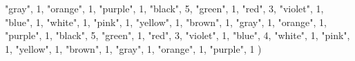 \documentclass[
]{article}
\newenvironment{Shaded}{\begin{snugshade}}{\end{snugshade}}
\newcommand{\DecValTok}[1]{\textcolor[rgb]{0.00,0.00,0.81}{#1}}
\newcommand{\NormalTok}[1]{#1}
\newcommand{\StringTok}[1]{\textcolor[rgb]{0.31,0.60,0.02}{#1}}
\begin{document}
\begin{Shaded}
\begin{Highlighting}[]
  \StringTok{"gray"}\NormalTok{, }\DecValTok{1}\NormalTok{,}
  \StringTok{"orange"}\NormalTok{, }\DecValTok{1}\NormalTok{,}
  \StringTok{"purple"}\NormalTok{, }\DecValTok{1}\NormalTok{,}
    \StringTok{"black"}\NormalTok{, }\DecValTok{5}\NormalTok{,}
  \StringTok{"green"}\NormalTok{, }\DecValTok{1}\NormalTok{,}
  \StringTok{"red"}\NormalTok{, }\DecValTok{3}\NormalTok{,}
  \StringTok{"violet"}\NormalTok{, }\DecValTok{1}\NormalTok{,}
  \StringTok{"blue"}\NormalTok{, }\DecValTok{1}\NormalTok{,}
  \StringTok{"white"}\NormalTok{, }\DecValTok{1}\NormalTok{,}
  \StringTok{"pink"}\NormalTok{, }\DecValTok{1}\NormalTok{,}
  \StringTok{"yellow"}\NormalTok{, }\DecValTok{1}\NormalTok{,}
  \StringTok{"brown"}\NormalTok{, }\DecValTok{1}\NormalTok{,}
  \StringTok{"gray"}\NormalTok{, }\DecValTok{1}\NormalTok{,}
  \StringTok{"orange"}\NormalTok{, }\DecValTok{1}\NormalTok{,}
  \StringTok{"purple"}\NormalTok{, }\DecValTok{1}\NormalTok{,}
    \StringTok{"black"}\NormalTok{, }\DecValTok{5}\NormalTok{,}
  \StringTok{"green"}\NormalTok{, }\DecValTok{1}\NormalTok{,}
  \StringTok{"red"}\NormalTok{, }\DecValTok{3}\NormalTok{,}
  \StringTok{"violet"}\NormalTok{, }\DecValTok{1}\NormalTok{,}
  \StringTok{"blue"}\NormalTok{, }\DecValTok{4}\NormalTok{,}
  \StringTok{"white"}\NormalTok{, }\DecValTok{1}\NormalTok{, }
  \StringTok{"pink"}\NormalTok{, }\DecValTok{1}\NormalTok{,}
  \StringTok{"yellow"}\NormalTok{, }\DecValTok{1}\NormalTok{,}
  \StringTok{"brown"}\NormalTok{, }\DecValTok{1}\NormalTok{,}
  \StringTok{"gray"}\NormalTok{, }\DecValTok{1}\NormalTok{,}
  \StringTok{"orange"}\NormalTok{, }\DecValTok{1}\NormalTok{,}
  \StringTok{"purple"}\NormalTok{, }\DecValTok{1}
\NormalTok{)}



\end{Highlighting}
\end{Shaded}
\end{document}
